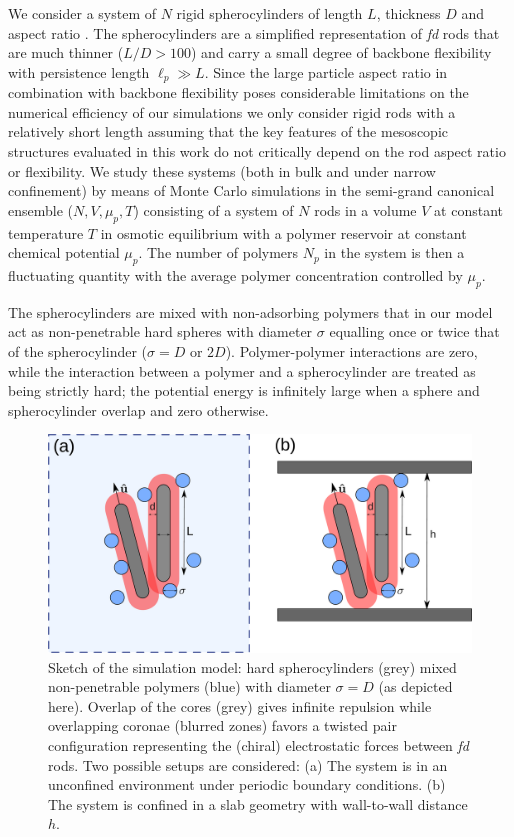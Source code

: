 We consider a system of $N$ rigid spherocylinders of length $L$, thickness $D$ and aspect ratio . The spherocylinders are a simplified representation of {\em fd} rods that are much thinner ($L/D > 100$) and carry a small degree of backbone flexibility with persistence length $\ell_{p} \gg L$. Since the large particle aspect ratio in combination with backbone flexibility poses considerable limitations on the numerical efficiency of our simulations  we  only consider rigid rods with a relatively short length assuming that the key features of the mesoscopic structures evaluated in this work do not  critically depend on the rod aspect ratio or flexibility. We study these systems (both in bulk and under narrow confinement) by means of Monte Carlo simulations in the semi-grand canonical ensemble ($N,V,\mu_{p},T$) consisting of a system of $N$ rods in a volume $V$ at constant temperature $T$ in osmotic equilibrium with a polymer reservoir at constant chemical potential $\mu_{p}$. The number of polymers  $N_{p}$ in the system is then a fluctuating quantity with the average polymer concentration controlled by $\mu_{p}$.


The spherocylinders are mixed with non-adsorbing polymers that in our model act as non-penetrable hard spheres with diameter $\sigma$ equalling once or twice that of the spherocylinder ($\sigma = D$ or $2D$). Polymer-polymer interactions are zero, while the interaction between a polymer and a spherocylinder are treated as being strictly hard;  the potential energy is infinitely large when a  sphere and spherocylinder overlap and zero otherwise.



\begin{figure}
	\includegraphics[width = \columnwidth]{figures/chapter-5/spheromans}
	\caption{ Sketch of the simulation model: hard spherocylinders (grey) mixed non-penetrable polymers (blue) with diameter $\sigma = D$ (as depicted here). Overlap of the cores (grey) gives infinite repulsion while overlapping coronae (blurred zones) favors a twisted pair configuration representing the (chiral) electrostatic forces between {\em fd} rods. Two possible setups are considered: (a) The system is in an unconfined environment under periodic boundary conditions. (b) The system is confined in a slab geometry with wall-to-wall distance $h$.  }
	\label{sketch}
\end{figure}


